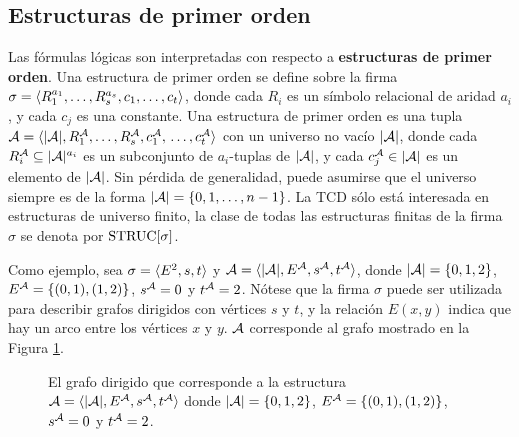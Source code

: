 \subsection{Estructuras de primer orden}
Las fórmulas lógicas son interpretadas con respecto a \textbf{estructuras de primer
orden}. Una estructura de primer orden se define sobre la firma
$\sigma=\langle R_1^{a_1},\ldots,R_s^{a_s},\\c_1,\ldots,c_t \rangle$, donde cada $R_i$ es
un símbolo relacional de aridad $a_i$, y cada $c_j$ es una constante. 
Una estructura de primer orden es una tupla
$\mathcal{A}=\langle |\mathcal{A}|,R_1^{\mathcal{A}},\ldots,R_s^{\mathcal{A}},c_1^{\mathcal{A}},\\\ldots,c_t^{\mathcal{A}} \rangle$ con un universo
no vacío $|\mathcal{A}|$, donde cada $R_i^{\mathcal{A}}\subseteq|\mathcal{A}|^{a_i}$ es un subconjunto de
$a_i$-tuplas de $|\mathcal{A}|$, y cada
$c_j^{\mathcal{A}}\in|\mathcal{A}|$ es un elemento de $|\mathcal{A}|$.
Sin pérdida de generalidad, puede asumirse que el universo siempre es de la
forma $|\mathcal{A}|=\{0,1,\ldots,n-1\}$.
La TCD sólo está interesada en estructuras de universo finito, la clase de
todas las estructuras finitas de la firma $\sigma$ se denota por $\text{STRUC}[\sigma]$.

Como ejemplo, sea $\sigma=\langle E^2,s,t \rangle$ y
$\mathcal{A}=\langle |\mathcal{A}|,E^{\mathcal{A}},s^{\mathcal{A}},t^{\mathcal{A}} \rangle$, donde $|\mathcal{A}|=\{0,1,2\}$,
$E^{\mathcal{A}}=\{(0,1),(1,2)\}$, $s^{\mathcal{A}}=0$ y $t^{\mathcal{A}}=2$.
Nótese que la firma $\sigma$ puede ser utilizada para describir grafos
dirigidos con vértices $s$ y $t$, y la relación $E(x, y)$ indica que hay un
arco entre los vértices $x$ y $y$. $\mathcal{A}$ corresponde al grafo mostrado en la
Figura \ref{grafo_simple}.

\begin{figure}[h]
\begin{center}
\end{center}
\caption[Grafo dirigido correspondiente a una estructura \A]{El grafo dirigido que corresponde a la estructura $\mathcal{A}=\langle |\mathcal{A}|,E^{\mathcal{A}},s^{\mathcal{A}},t^{\mathcal{A}} \rangle$
donde $|\mathcal{A}|=\{0,1,2\}$, $E^{\mathcal{A}}=\{(0,1),(1,2)\}$, $s^{\mathcal{A}}=0$ y $t^{\mathcal{A}}=2$.}
\label{grafo_simple}
\end{figure}


